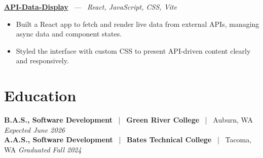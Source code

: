 \documentclass[10pt, letterpaper]{article}
\newcommand{\jobhead}[4]{%
  \vspace{5pt}%
  {\bfseries\color{dark}#1}%
  ~{\color{light}|}~%
  {\bfseries\color{navy}#2}%
  ~{\color{light}|}~%
  {\color{light}#3}%
  \hfill{\color{light}\small\textit{#4}}\\[-2pt]%
}
\newcommand{\projhead}[3]{%
  \vspace{5pt}%
  {\bfseries\color{dark}\href{#2}{#1}}%
  ~{\color{light}---}~%
  {\color{light}\small\textit{#3}}\\[-2pt]%
}
\begin{document}
\projhead{API-Data-Display}{https://github.com/timmyd4/API-Data-Display}{React, JavaScript, CSS, Vite}
\begin{itemize}
  \item Built a React app to fetch and render live data from external APIs, managing async data and component states.
  \item Styled the interface with custom CSS to present API-driven content clearly and responsively.
\end{itemize}

\section{Education}

\jobhead{B.A.S., Software Development}{Green River College}{Auburn, WA}{Expected June 2026}
\jobhead{A.A.S., Software Development}{Bates Technical College}{Tacoma, WA}{Graduated Fall 2024}
\end{document}
